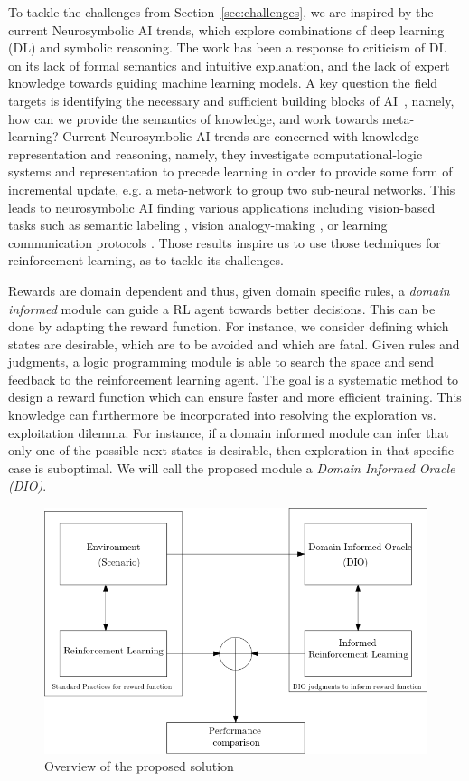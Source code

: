 \documentclass[a4paper,11pt]{article}
\theoremstyle{definition}
\begin{document}
To tackle the challenges from Section~\ref{sec:challenges}, we are
inspired by the current Neurosymbolic AI trends, which explore
combinations of deep learning (DL) and symbolic reasoning.
%
The work has been a response to criticism of DL on its lack of formal
semantics and intuitive explanation, and the lack of expert knowledge
towards guiding machine learning models.
%
A key question the field targets is identifying the necessary and
sufficient building blocks of AI~\cite{garcez2020neurosymbolic},
namely, how can we provide the semantics of knowledge, and work
towards meta-learning? 
%
Current Neurosymbolic AI trends are concerned with knowledge representation and reasoning, namely, they investigate computational-logic systems 
and representation to precede learning in order to provide some form of incremental update, e.g. a meta-network to group two sub-neural networks. \cite{Besold2017NeuralSymbolicLA}
This leads to neurosymbolic AI finding various applications including vision-based tasks such as semantic labeling \cite{vinyals2015, karpathy2015}, 
vision analogy-making \cite{Reed2015DeepVA}, or learning communication protocols \cite{Foerster2016LearningTC}. Those results inspire us to use those techniques for reinforcement learning, as to tackle its challenges.

\medskip
Rewards are domain dependent and thus, given domain specific rules, a \emph{domain informed} module can guide a RL agent towards better decisions. This can be done by 
adapting the reward function. For instance, we consider defining which states are desirable, which are to be avoided and which are fatal. Given rules and judgments, a logic programming module 
is able to search the space and send feedback to the reinforcement learning agent. The goal is a systematic method to design a reward function which can ensure faster and more efficient 
training. This knowledge can furthermore be incorporated into resolving the exploration vs. exploitation dilemma. For instance, if a domain informed module 
can infer that only one of the possible next states is desirable, then exploration in that specific case is suboptimal.  
We will call the proposed module a \emph{Domain Informed Oracle (DIO)}. 

\begin{figure}[H]
  \centering
  \includegraphics[scale=0.5]{overview.png}
  \caption{Overview of the proposed solution}
  \label{fig:overview}
\end{figure}
\end{document}
